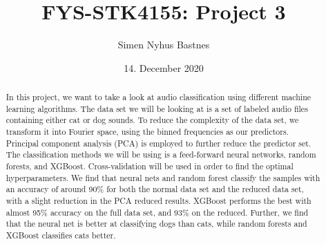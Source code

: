 \documentclass[a4paper]{article}
\title{FYS-STK4155: Project 3}
\author{Simen Nyhus Bastnes}
\date{14. December 2020}
\newcommand\red[1]{\textcolor{red}{\textbf{#1}}}
\begin{document}
\maketitle
\begin{abstract}
In this project, we want to take a look at audio classification using different machine learning algorithms. The data set we will be looking at is a set of labeled audio files containing either cat or dog sounds. To reduce the complexity of the data set, we transform it into Fourier space, using the binned frequencies as our predictors. Principal component analysis (PCA) is employed to further reduce the predictor set. The classification methods we will be using is a feed-forward neural networks, random forests, and XGBoost. Cross-validation will be used in order to find the optimal hyperparameters.
We find that neural nets and random forest classify the samples with an accuracy of around 90\% for both the normal data set and the reduced data set, with a slight reduction in the PCA reduced results. XGBoost performs the best with almost 95\% accuracy on the full data set, and 93\% on the reduced. Further, we find that the neural net is better at classifying dogs than cats, while random forests and XGBoost classifies cats better.


\end{abstract}
\end{document}
